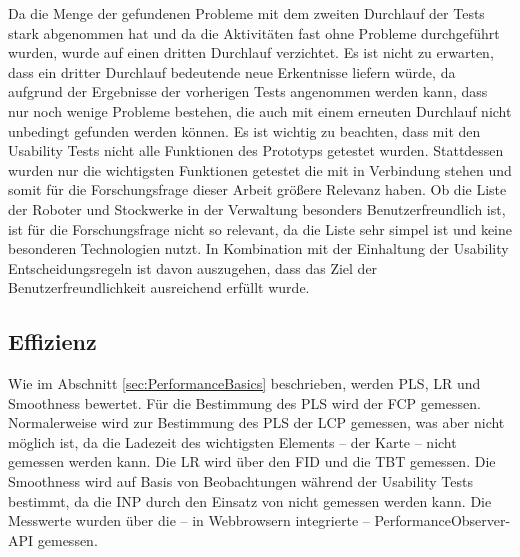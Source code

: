 Da die Menge der gefundenen Probleme mit dem zweiten Durchlauf der Tests stark abgenommen hat und da die Aktivitäten fast ohne Probleme durchgeführt wurden, wurde auf einen dritten Durchlauf verzichtet. Es ist nicht zu erwarten, dass ein dritter Durchlauf bedeutende neue Erkentnisse liefern würde, da aufgrund der Ergebnisse der vorherigen Tests angenommen werden kann, dass nur noch wenige Probleme bestehen, die auch mit einem erneuten Durchlauf nicht unbedingt gefunden werden können. Es ist wichtig zu beachten, dass mit den Usability Tests nicht alle Funktionen des Prototyps getestet wurden. Stattdessen wurden nur die wichtigsten Funktionen getestet die mit \deckgl{} in Verbindung stehen und somit für die Forschungsfrage dieser Arbeit größere Relevanz haben. Ob die Liste der Roboter und Stockwerke in der Verwaltung besonders Benutzerfreundlich ist, ist für die Forschungsfrage nicht so relevant, da die Liste sehr simpel ist und keine besonderen Technologien nutzt. In Kombination mit der Einhaltung der Usability Entscheidungsregeln ist davon auszugehen, dass das Ziel der Benutzerfreundlichkeit ausreichend erfüllt wurde.

\subsection{Effizienz}
Wie im Abschnitt \ref{sec:PerformanceBasics} beschrieben, werden \ac{PLS}, \ac{LR} und Smoothness bewertet. Für die Bestimmung des \ac{PLS} wird der \ac{FCP} gemessen. Normalerweise wird zur Bestimmung des \ac{PLS} der \ac{LCP} gemessen, was aber nicht möglich ist, da die Ladezeit des wichtigsten Elements – der \deckgl{} Karte – nicht gemessen werden kann. Die \ac{LR} wird über den \ac{FID} und die \ac{TBT} gemessen. Die Smoothness wird auf Basis von Beobachtungen während der Usability Tests bestimmt, da die \ac{INP} durch den Einsatz von \deckgl{} nicht gemessen werden kann. Die Messwerte wurden über die – in Webbrowsern integrierte – PerformanceObserver-\ac{API} \cite{PerformanceObserver} gemessen.




